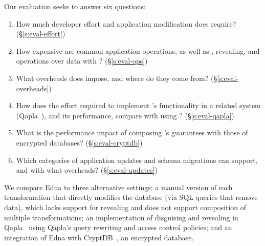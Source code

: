 
Our evaluation seeks to answer six questions:
%
\begin{enumerate}[nosep]
 \item How much developer effort and application modification does \sys require? (\S\ref{s:eval-effort})
%
\item How expensive are common application operations, as well as
  \xxing, revealing, and operations over \xxed data with \sys? (\S\ref{s:eval-ops})

\item What overheads does \sys impose, and where do they come from?
    (\S\ref{s:eval-overheads})

\item 
    How does the effort required to implement \sys's
    functionality in a related system (Qapla~\cite{qapla}),
    and its performance, compare with using \sys?
    (\S\ref{s:eval-qapla})

\item 
    What is the performance impact of composing \sys's guarantees
    with those of encrypted databases?
        (\S\ref{s:eval-cryptdb})

\item 
    Which categories of application updates and schema migrations can \sys
        support, and with what overheads? (\S\ref{s:eval-updates})
%
\end{enumerate}

We compare Edna to three alternative settings:
\one{} a manual version
of each \xxing transformation that directly modifies the database
(\eg via SQL queries that remove data), which
lacks support for revealing and does not support
composition of multiple transformations;
\two{} an implementation of disguising and revealing in Qapla~\cite{qapla}
using Qapla’s query rewriting and access control policies; and \three{} an integration of Edna with CryptDB~\cite{cryptdb}, an encrypted database.

%

%
%
%
%

